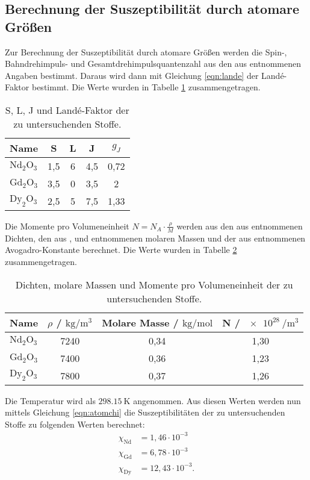 \subsection{Berechnung der Suszeptibilität durch atomare Größen}
Zur Berechnung der Suszeptibilität durch atomare Größen werden die Spin-, Bahndrehimpuls- und Gesamtdrehimpulsquantenzahl aus den aus \cite{sample} entnommenen Angaben bestimmt.
Daraus wird dann mit Gleichung \eqref{eqn:lande} der Landé-Faktor bestimmt. Die Werte wurden in Tabelle \ref{tab:lande} zusammengetragen.
\begin{table}
  \centering
  \caption{S, L, J und Landé-Faktor der zu untersuchenden Stoffe.}
  \label{tab:lande}
  \begin{tabular}{l c c c c}
    \toprule
Name & S & L & J & $g_J$ \\
    \midrule
  $\text{Nd}_2 \text{O}_3$ & 1,5 & 6 & 4,5 & 0,72 \\
  $\text{Gd}_2 \text{O}_3$ & 3,5 & 0 & 3,5 & 2 \\
  $\text{Dy}_2 \text{O}_3$ & 2,5 & 5 & 7,5 & 1,33 \\
  \bottomrule
  \end{tabular}
\end{table}
Die Momente pro Volumeneinheit $N=N_A \cdot \frac{\rho}{M}$ werden aus den aus \cite{sample} entnommenen Dichten, den aus \cite{dy}, \cite{gd} und \cite{nd} entnommenen molaren Massen und der
aus \cite{scipy} entnommenen Avogadro-Konstante berechnet. Die Werte wurden in Tabelle \ref{tab:N} zusammengetragen.
\begin{table}
  \centering
  \caption{Dichten, molare Massen und Momente pro Volumeneinheit der zu untersuchenden Stoffe.}
  \label{tab:N}
  \begin{tabular}{l c c c}
    \toprule
Name & $\rho$ / $\si{\kilo\gram\per\meter\cubed}$ & Molare Masse / $\si{\kilo\gram\per\mol}$ & N / $\SI{e28}{\per\meter\cubed}$ \\
    \midrule
  $\text{Nd}_2 \text{O}_3$ & 7240 & 0,34 & 1,30\\
  $\text{Gd}_2 \text{O}_3$ & 7400 & 0,36 & 1,23\\
  $\text{Dy}_2 \text{O}_3$ & 7800 & 0,37 & 1,26 \\
  \bottomrule
  \end{tabular}
\end{table}
Die Temperatur wird als $\SI{298.15}{\kelvin}$ angenommen.
Aus diesen Werten werden nun mittels Gleichung \eqref{eqn:atomchi} die Suszeptibilitäten der zu untersuchenden Stoffe zu folgenden Werten berechnet:
\begin{align*}
  \chi_\text{Nd} &= 1,46\cdot10^{-3} \\
  \chi_\text{Gd} &= 6,78\cdot10^{-3}\\
  \chi_\text{Dy} &= 12,43\cdot10^{-3} .
\end{align*}
